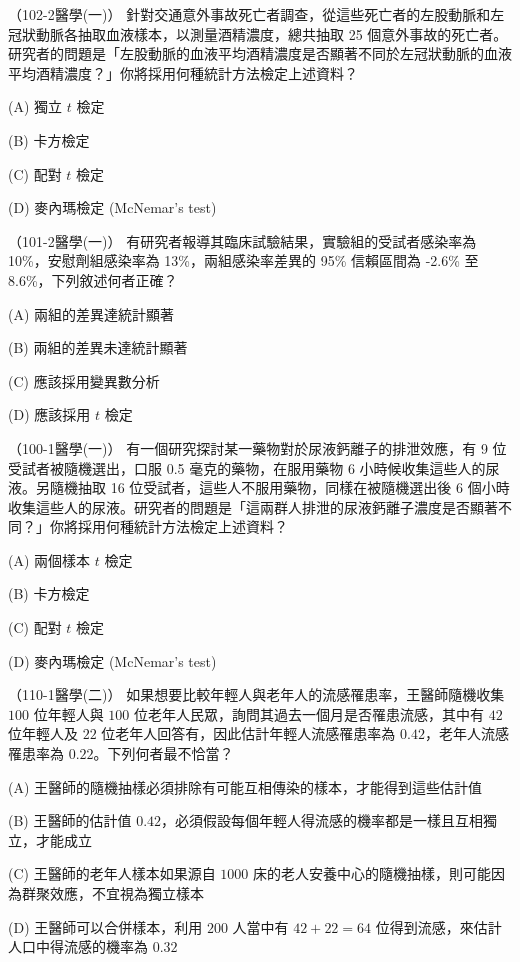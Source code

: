     \begin{docexam}{（102-2醫學(一)）}
        針對交通意外事故死亡者調查，從這些死亡者的左股動脈和左冠狀動脈各抽取血液樣本，以測量酒精濃度，總共抽取 25 個意外事故的死亡者。研究者的問題是「左股動脈的血液平均酒精濃度是否顯著不同於左冠狀動脈的血液平均酒精濃度？」你將採用何種統計方法檢定上述資料？

        (A) 獨立 $t$ 檢定

        (B) 卡方檢定

        (C) 配對 $t$ 檢定

        (D) 麥內瑪檢定 (McNemar's test)
    \end{docexam}
    
    \begin{docexam}{（101-2醫學(一)）}
        有研究者報導其臨床試驗結果，實驗組的受試者感染率為 10\%，安慰劑組感染率為 13\%，兩組感染率差異的 95\% 信賴區間為 -2.6\% 至 8.6\%，下列敘述何者正確？        

        (A) 兩組的差異達統計顯著

        (B) 兩組的差異未達統計顯著

        (C) 應該採用變異數分析

        (D) 應該採用 $t$ 檢定
    \end{docexam}
    
    \begin{docexam}{（100-1醫學(一)）}
        有一個研究探討某一藥物對於尿液鈣離子的排泄效應，有 9 位受試者被隨機選出，口服 0.5 毫克的藥物，在服用藥物 6 小時候收集這些人的尿液。另隨機抽取 16 位受試者，這些人不服用藥物，同樣在被隨機選出後 6 個小時收集這些人的尿液。研究者的問題是「這兩群人排泄的尿液鈣離子濃度是否顯著不同？」你將採用何種統計方法檢定上述資料？

        (A) 兩個樣本 $t$ 檢定

        (B) 卡方檢定

        (C) 配對 $t$ 檢定

        (D) 麥內瑪檢定 (McNemar's test)
    \end{docexam}
    
    \begin{docexam}{（110-1醫學(二)）}
        如果想要比較年輕人與老年人的流感罹患率，王醫師隨機收集 $100$ 位年輕人與 $100$ 位老年人民眾，詢問其過去一個月是否罹患流感，其中有 $42$ 位年輕人及 $22$ 位老年人回答有，因此估計年輕人流感罹患率為 $0.42$，老年人流感罹患率為 $0.22$。下列何者最不恰當？

        (A) 王醫師的隨機抽樣必須排除有可能互相傳染的樣本，才能得到這些估計值

        (B) 王醫師的估計值 $0.42$，必須假設每個年輕人得流感的機率都是一樣且互相獨立，才能成立

        (C) 王醫師的老年人樣本如果源自 $1000$ 床的老人安養中心的隨機抽樣，則可能因為群聚效應，不宜視為獨立樣本

        (D) 王醫師可以合併樣本，利用 $200$ 人當中有 $42+22=64$ 位得到流感，來估計人口中得流感的機率為 $0.32$
    \end{docexam}

